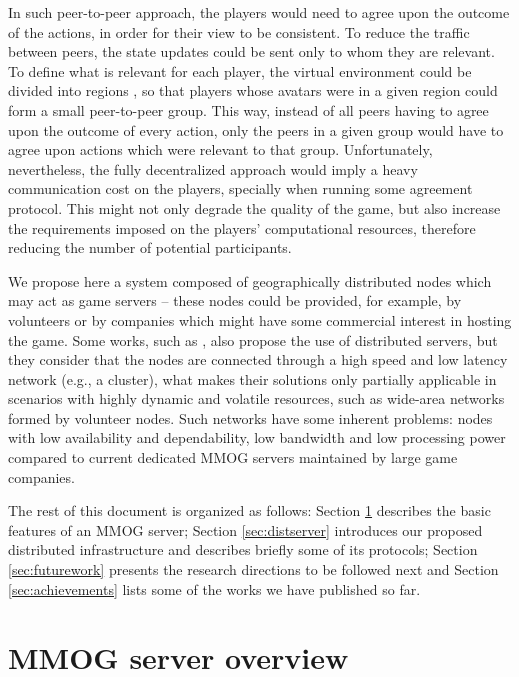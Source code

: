 \documentclass[]{usiinfprospectus}
\begin{document}
In such peer-to-peer approach, the players would need to agree upon the outcome of the actions, in order for their view to be consistent. To reduce the traffic between peers, the state updates could be sent only to whom they are relevant. To define what is relevant for each player, the virtual environment could be divided into regions \cite{schiele2007rpp}, so that players whose avatars were in a given region could form a small peer-to-peer group. This way, instead of all peers having to agree upon the outcome of every action, only the peers in a given group would have to agree upon actions which were relevant to that group. Unfortunately, nevertheless, the fully decentralized approach would imply a heavy communication cost on the players, specially when running some agreement protocol. This might not only degrade the quality of the game, but also increase the requirements imposed on the players' computational resources, therefore reducing the number of potential participants.

We propose here a system composed of geographically distributed nodes which may act as game servers -- these nodes could be provided, for example, by volunteers or by companies which might have some commercial interest in hosting the game. Some works, such as \cite{assiotis2006dam, ng2002msa, chertov2006olb, lee2003sdl}, also propose the use of distributed servers, but they consider that the nodes are connected through a high speed and low latency network (e.g., a cluster), what makes their solutions only partially applicable in scenarios with highly dynamic and volatile resources, such as wide-area networks formed by volunteer nodes. Such networks have some inherent problems: nodes with low availability and dependability, low bandwidth and low processing power compared to current dedicated MMOG servers maintained by large game companies.

The rest of this document is organized as follows: Section \ref{sec:mmogserver} describes the basic features of an MMOG server; Section \ref{sec:distserver} introduces our proposed distributed infrastructure and describes briefly some of its protocols; Section \ref{sec:futurework} presents the research directions to be followed next and Section \ref{sec:achievements} lists some of the works we have published so far.

\section{MMOG server overview} \label{sec:mmogserver}
\end{document}
